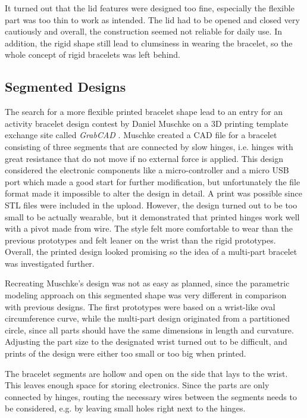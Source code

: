 It turned out that the lid features were designed too fine, especially the flexible part was too thin to work as intended. The lid had to be opened and closed very cautiously and overall, the construction seemed not reliable for daily use. In addition, the rigid shape still lead to clumsiness in wearing the bracelet, so the whole concept of rigid bracelets was left behind.

\subsection{Segmented Designs}

The search for a more flexible printed bracelet shape lead to an entry for an activity bracelet design contest by Daniel Muschke on a 3D printing template exchange site called \textit{GrabCAD} \cite{amicobracelet}. Muschke created a \ac{CAD} file for a bracelet consisting of three segments that are connected by slow hinges, i.e. hinges with great resistance that do not move if no external force is applied. This design considered the electronic components like a micro-controller and a micro \ac{USB} port which made a good start for further modification, but unfortunately the file format made it impossible to alter the design in detail. A print was possible since \ac{STL} files were included in the upload. However, the design turned out to be too small to be actually wearable, but it demonstrated that printed hinges work well with a pivot made from wire. The style felt more comfortable to wear than the previous prototypes and felt leaner on the wrist than the rigid prototypes. Overall, the printed design looked promising so the idea of a multi-part bracelet was investigated further.

Recreating Muschke's design was not as easy as planned, since the parametric modeling approach on this segmented shape was very different in comparison with previous designs. The first prototypes were based on a wrist-like oval circumference curve, while the multi-part design originated from a partitioned circle, since all parts should have the same dimensions in length and curvature. Adjusting the part size to the designated wrist turned out to be difficult, and prints of the design were either too small or too big when printed.

The bracelet segments are hollow and open on the side that lays to the wrist. This leaves enough space for storing electronics. Since the parts are only connected by hinges, routing the necessary wires between the segments needs to be considered, e.g. by leaving small holes right next to the hinges.

